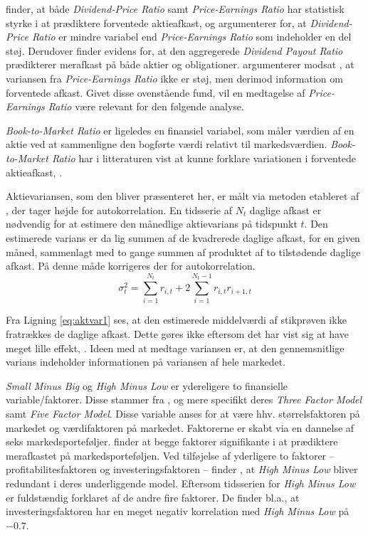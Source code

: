 \documentclass[
  a4paper,
  oneside]{memoir}
\begin{document}
\citep{Fama1988} finder, at både \emph{Dividend-Price Ratio} samt \emph{Price-Earnings Ratio} har statistisk styrke i at prædiktere forventede aktieafkast, og argumenterer for, at \emph{Dividend-Price Ratio} er mindre variabel end \emph{Price-Earnings Ratio} som indeholder en del støj. Derudover finder \citep{Lamont1998} evidens for, at den aggregerede \emph{Dividend Payout Ratio} prædikterer merafkast på både aktier og obligationer. \citep{Lamont1998} argumenterer modsat \citep{Fama1988}, at variansen fra \emph{Price-Earnings Ratio} ikke er støj, men derimod information om forventede afkast. Givet disse ovenstående fund, vil en medtagelse af \emph{Price-Earnings Ratio} være relevant for den følgende analyse.

\emph{Book-to-Market Ratio} er ligeledes en finansiel variabel, som måler værdien af en aktie ved at sammenligne den bogførte værdi relativt til markedsværdien. \emph{Book-to-Market Ratio} har i litteraturen vist at kunne forklare variationen i forventede aktieafkast, \citep{Kothari1997}.

Aktievariansen, som den bliver præsenteret her, er målt via metoden etableret af \citep{Schwert1987}, der tager højde for autokorrelation. En tidsserie af \(N_t\) daglige afkast er nødvendig for at estimere den månedlige aktievarians på tidspunkt \(t\). Den estimerede varians er da lig summen af de kvadrerede daglige afkast, for en given måned, sammenlagt med to gange summen af produktet af to tilstødende daglige afkast. På denne måde korrigeres der for autokorrelation.
\begin{equation}
\sigma^2_t = \sum_{i=1}^{N_t} r_{i,t} + 2 \sum_{i=1}^{N_t-1} r_{i,t}r_{i+1,t} \label{eq:aktvar1}
\end{equation}

Fra Ligning \eqref{eq:aktvar1} ses, at den estimerede middelværdi af stikprøven ikke fratrækkes de daglige afkast. Dette gøres ikke eftersom det har vist sig at have meget lille effekt, \citep{Schwert1987}. Ideen med at medtage variansen er, at den gennemsnitlige varians indeholder informationen på variansen af hele markedet.

\emph{Small Minus Big} og \emph{High Minus Low} er ydereligere to finansielle variable/faktorer. Disse stammer fra \citep{French1993, Fama2015}, og mere specifikt deres \emph{Three Factor Model} samt \emph{Five Factor Model}. Disse variable anses for at være hhv. størrelsfaktoren på markedet og værdifaktoren på markedet. Faktorerne er skabt via en dannelse af seks markedsporteføljer. \citep{French1993} finder at begge faktorer signifikante i at prædiktere merafkastet på markedsporteføljen. Ved tilføjelse af yderligere to faktorer -- profitabilitesfaktoren og investeringsfaktoren -- finder \citep{Fama2015}, at \emph{High Minus Low} bliver redundant i deres underliggende model. Eftersom tidsserien for \emph{High Minus Low} er fuldstændig forklaret af de andre fire faktorer. De finder bl.a., at investeringsfaktoren har en meget negativ korrelation med \emph{High Minus Low} på \(-0.7\).
\end{document}
